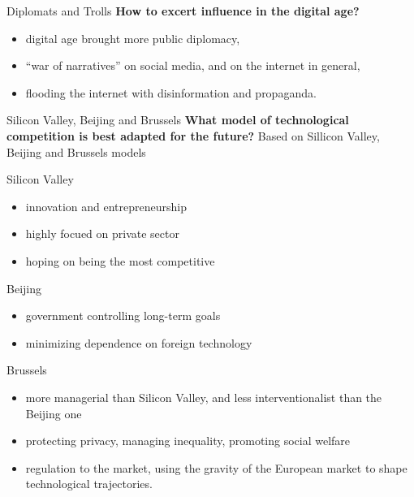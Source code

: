 \documentclass[xcolor=table]{beamer}
\begin{document}
\begin{frame}{Diplomats and Trolls}
\textbf{How to excert influence in the digital age?}
\begin{itemize}
\item digital age brought more public diplomacy,
\item ``war of narratives'' on social media, and on the internet in general,
\item flooding the internet with disinformation and propaganda.
\end{itemize}
\end{frame}

\begin{frame}{Silicon Valley, Beijing and Brussels}
\Large{\textbf{What model of technological competition is best adapted for the future?}} \newline
Based on Sillicon Valley, Beijing and Brussels models
\end{frame}

\begin{frame}{Silicon Valley}
\begin{itemize}
\item innovation and entrepreneurship
\item highly focued on private sector
\item hoping on being the most competitive
\end{itemize}
\end{frame}

\begin{frame}{Beijing}
\begin{itemize}
\item government controlling long-term goals
\item minimizing dependence on foreign technology
\end{itemize}
\end{frame}

\begin{frame}{Brussels}
\begin{itemize}
\item more managerial than Silicon Valley, and less interventionalist than the Beijing one
\item protecting privacy, managing inequality, promoting social welfare
\item regulation to the market, using the gravity of the European market to shape technological trajectories.
\end{itemize}
\end{frame}
\end{document}
